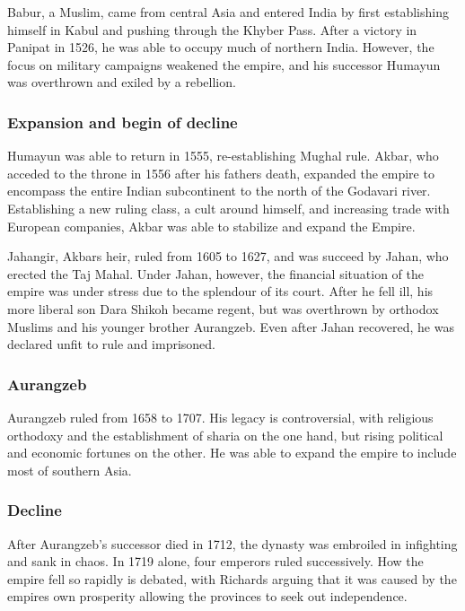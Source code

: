 \documentclass[11pt, a4paper, headings=standardclasses]{scrartcl}
\begin{document}
Babur, a Muslim, came from central Asia and entered India by first establishing himself in Kabul and pushing through the Khyber Pass.
 After a victory in Panipat in 1526, he was able to occupy much of northern India. However, the focus on military campaigns weakened the empire, and his successor Humayun was overthrown and exiled by a rebellion.\autocite[Chapter 1]{richards}

\subsubsection{Expansion and begin of decline}

Humayun was able to return in 1555, re-establishing Mughal rule.\autocite[12]{richards} Akbar, who acceded to the throne in 1556 after his fathers death, expanded the empire to encompass the entire Indian subcontinent to the north of the Godavari river. Establishing a new ruling class, a cult around himself, and increasing trade with European companies, Akbar was able to stabilize and expand the Empire.\autocite[16]{richards}

Jahangir, Akbars heir, ruled from 1605 to 1627, and was succeed by Jahan, who erected the Taj Mahal. Under Jahan, however, the financial situation of the empire was under stress due to the splendour of its court.\autocite[Chapter 6]{richards} After he fell ill, his more liberal son Dara Shikoh became regent, but was overthrown by orthodox Muslims and his younger brother Aurangzeb. Even after Jahan recovered, he was declared unfit to rule and imprisoned.\autocite[Chapter 7]{richards}

\subsubsection{Aurangzeb}

Aurangzeb ruled from 1658 to 1707\autocite[165]{richards}. His legacy is controversial, with religious orthodoxy and the establishment of sharia on the one hand, but rising political and economic fortunes on the other. He was able to expand the empire to include most of southern Asia.\autocite[Chapter 8]{richards}

\subsubsection{Decline}

After Aurangzeb's successor died in 1712, the dynasty was embroiled in infighting and sank in chaos. In 1719 alone, four emperors ruled successively.\autocite[Chapter 12]{richards} How the empire fell so rapidly is debated, with Richards arguing that it was caused by the empires own prosperity allowing the provinces to seek out independence.\autocite{MughalFinances}
\end{document}
